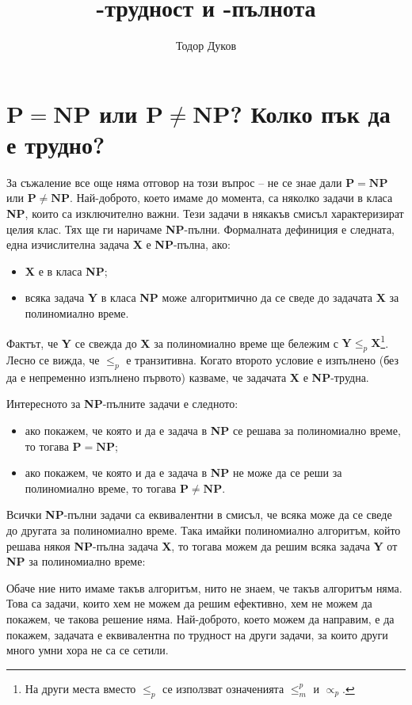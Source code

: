 \documentclass{article}
\title{\NP-трудност и \NP-пълнота}
\author{Тодор Дуков}
\date{}
\newcommand{\NP}{\textbf{NP}}
\theoremstyle{definition}
\theoremstyle{plain}
\theoremstyle{remark}
\theoremstyle{definition}
\begin{document}
\maketitle

\section*{$\mathbf{P = NP}$ или $\mathbf{P \neq NP}$? Колко пък да е трудно?}

За съжаление все още няма отговор на този въпрос -- не се знае дали $\mathbf{P = NP}$  или $\mathbf{P \neq NP}$.
Най-доброто, което имаме до момента, са няколко задачи в класа \NP, които са изключително важни.
Тези задачи в някакъв смисъл характеризират целия клас.
Тях ще ги наричаме \NP-пълни.
Формалната дефиниция е следната, една изчислителна задача \textbf{X} е \NP-пълна, ако:
\begin{itemize}
    \item \textbf{X} е в класа \NP;
    \item всяка задача \textbf{Y} в класа \NP{ }може алгоритмично да се сведе до задачата \textbf{X} за полиномиално време.
\end{itemize}
Фактът, че \textbf{Y} се свежда до \textbf{X} за полиномиално време ще бележим с $\mathbf{Y} \leq_p \mathbf{X}$\footnote{На други места вместо $\leq_p$ се използват означенията $\leq^p_m$ и $\propto_p$.}.
Лесно се вижда, че $\leq_p$ е транзитивна.
Когато второто условие е изпълнено (без да е непременно изпълнено първото) казваме, че задачата \textbf{X} е \NP-трудна.

Интересното за \NP-пълните задачи е следното:
\begin{itemize}
    \item ако покажем, че която и да е задача в \NP{ }се решава за полиномиално време, то тогава $\mathbf{P = NP}$;
    \item ако покажем, че която и да е задача в \NP{ }не може да се реши за полиномиално време, то тогава $\mathbf{P \neq NP}$.
\end{itemize}
Всички \NP-пълни задачи са еквивалентни в смисъл, че всяка може да се сведе до другата за полиномиално време.
Така имайки полиномиално алгоритъм, който решава някоя \NP-пълна задача \textbf{X}, то тогава можем да решим всяка задача \textbf{Y} от \NP{} за полиномиално време:

Обаче ние нито имаме такъв алгоритъм, нито не знаем, че такъв алгоритъм няма.
Това са задачи, които хем не можем да решим ефективно, хем не можем да покажем, че такова решение няма.
Най-доброто, което можем да направим, е да покажем, задачата е еквивалентна по трудност на други задачи, за които други много умни хора не са се сетили.
\end{document}
